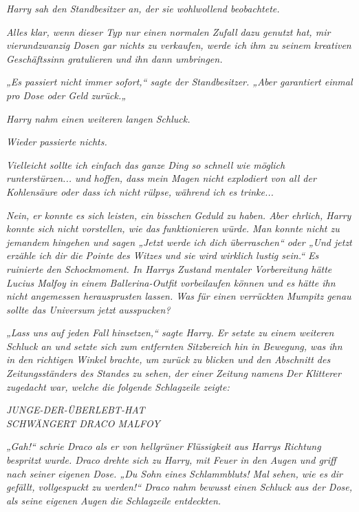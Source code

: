 {\emph{Harry sah den Standbesitzer an, der sie wohlwollend beobachtete.}

\emph{\emph{Alles klar, wenn dieser Typ nur einen normalen Zufall dazu genutzt hat, mir vierundzwanzig Dosen gar nichts zu verkaufen, werde ich ihm zu seinem kreativen Geschäftssinn gratulieren und ihn dann umbringen.}}

\emph{„Es passiert nicht immer sofort,“ sagte der Standbesitzer. „Aber garantiert einmal pro Dose oder Geld zurück.„}

\emph{Harry nahm einen weiteren langen Schluck.}

\emph{Wieder passierte nichts.}

\emph{\emph{Vielleicht sollte ich einfach das ganze Ding so schnell wie möglich runterstürzen... und hoffen, dass mein Magen nicht explodiert von all der Kohlensäure oder dass ich nicht rülpse, während ich es trinke...}}

\emph{Nein, er konnte es sich leisten, ein} \emph{\emph{bisschen}} \emph{Geduld zu haben. Aber ehrlich, Harry konnte sich nicht vorstellen, wie das funktionieren würde. Man konnte nicht zu jemandem hingehen und sagen „Jetzt werde ich dich überraschen“ oder „Und jetzt erzähle ich dir die Pointe des Witzes und sie wird wirklich lustig sein.“ Es ruinierte den Schockmoment. In Harrys Zustand mentaler Vorbereitung hätte Lucius Malfoy in einem Ballerina-Outfit vorbeilaufen können und es hätte ihn nicht angemessen herausprusten lassen. Was für einen verrückten Mumpitz genau sollte das Universum} \emph{\emph{jetzt}} \emph{ausspucken?}

\emph{„Lass uns auf jeden Fall hinsetzen,“ sagte Harry. Er setzte zu einem weiteren Schluck an und setzte sich zum entfernten Sitzbereich hin in Bewegung, was ihn in den richtigen Winkel brachte, um zurück zu blicken und den Abschnitt des Zeitungsständers des Standes zu sehen, der einer Zeitung namens} \emph{\emph{Der Klitterer}} \emph{zugedacht war, welche die folgende Schlagzeile zeigte:}

\emph{JUNGE-DER-ÜBERLEBT-HAT\\ SCHWÄNGERT DRACO MALFOY}

\hfill\break \emph{„\emph{Gah!}“ schrie Draco als er von hellgrüner Flüssigkeit aus Harrys Richtung} \emph{bespritzt wurde. Draco drehte sich zu Harry, mit Feuer in den Augen und griff nach seiner eigenen Dose. „Du Sohn eines Schlammbluts! Mal sehen, wie es} \emph{\emph{dir}} \emph{gefällt, vollgespuckt zu werden!“ Draco nahm bewusst einen Schluck aus der Dose, als seine eigenen Augen die Schlagzeile entdeckten.}

}
